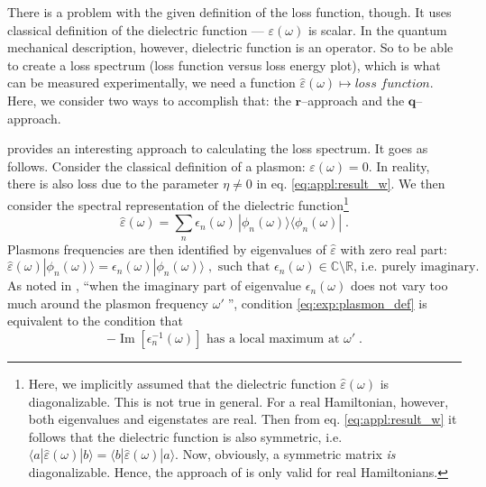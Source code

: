 \documentclass[a4paper,12pt]{article}
\begin{document}
    There is a problem with the given definition of the loss function, though. It uses classical definition of the dielectric function --- $\varepsilon(\omega)$ is scalar. In the quantum mechanical description, however, dielectric function is an operator. So to be able to create a loss spectrum (loss function versus loss energy plot), which is what can be measured experimentally, we need a function $\hat\varepsilon(\omega) \mapsto \textit{loss function}$. Here, we consider two ways to accomplish that: the $\mathbf{r}$--approach and the $\mathbf{q}$--approach.

    \cite{plasmonic2015} provides an interesting approach to calculating the loss spectrum. It goes as follows. Consider the classical definition of a plasmon: $\varepsilon(\omega) = 0$. In reality, there is also loss due to the parameter $\eta \neq 0$ in eq. \eqref{eq:appl:result_w}. We then consider the spectral representation of the dielectric function\footnote{ %
    Here, we implicitly assumed that the dielectric function $\hat\varepsilon(\omega)$ is diagonalizable. This is not true in general. For a real Hamiltonian, however, both eigenvalues and eigenstates are real. Then from eq. \eqref{eq:appl:result_w} it follows that the dielectric function is also symmetric, i.e. $\langle a|\hat\varepsilon(\omega)|b \rangle = \langle b|\hat\varepsilon(\omega)|a \rangle$. Now, obviously, a symmetric matrix \textit{is} diagonalizable. Hence, the approach of \cite{plasmonic2015} is only valid for real Hamiltonians.}
    \begin{equation*}
        \hat\varepsilon(\omega) = \sum_n \epsilon_n(\omega) \, |\phi_n(\omega)\rangle\!\langle \phi_n(\omega)|\; .
    \end{equation*}
    Plasmons frequencies are then identified by eigenvalues of $\hat\varepsilon$ with zero real part:
    \begin{equation} \label{eq:exp:plasmon_def}
        \hat\varepsilon(\omega)|\phi_n(\omega)\rangle = \epsilon_n(\omega) |\phi_n(\omega)\rangle\;,\text{ such that }\epsilon_n(\omega) \in \mathbb{C}\setminus\mathbb{R}\text{, i.e. purely imaginary.}
    \end{equation}
    As noted in \cite{andersen2012spatially}, ``when the imaginary part of eigenvalue $\epsilon_n(\omega)$ does not vary too much around the plasmon frequency $\omega'\;$'', condition \eqref{eq:exp:plasmon_def} is equivalent to the condition that
    \begin{equation} \label{eq:exp:plasmon_qm_condition}
        -\operatorname{Im}[\epsilon_n^{-1}(\omega)] \text{ has a local maximum at }\omega'\;.
    \end{equation}
\end{document}
